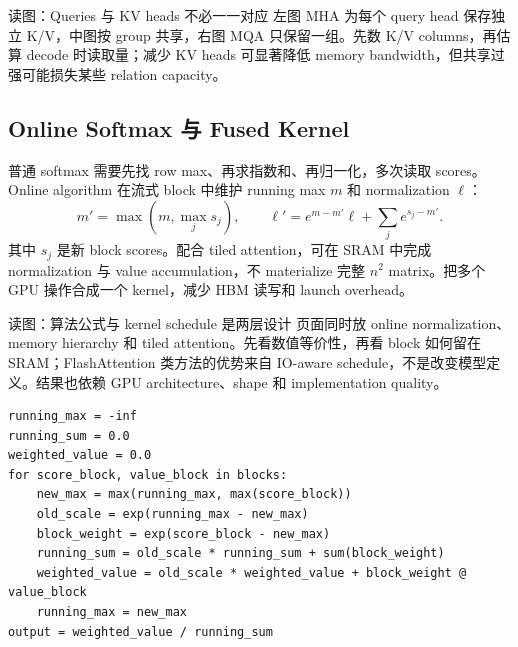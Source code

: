 
\begin{knowledgebox}{读图：Queries 与 KV heads 不必一一对应}
左图 MHA 为每个 query head 保存独立 K/V，中图按 group 共享，右图 MQA 只保留一组。先数 K/V columns，再估算 decode 时读取量；减少 KV heads 可显著降低 memory bandwidth，但共享过强可能损失某些 relation capacity。
\end{knowledgebox}

\subsection{Online Softmax 与 Fused Kernel}

普通 softmax 需要先找 row max、再求指数和、再归一化，多次读取 scores。Online algorithm 在流式 block 中维护 running max $m$ 和 normalization $\ell$：
\[
m' = \max(m,\max_j s_j),\qquad
\ell'=e^{m-m'}\ell+\sum_j e^{s_j-m'}.
\]
其中 $s_j$ 是新 block scores。配合 tiled attention，可在 SRAM 中完成 normalization 与 value accumulation，不 materialize 完整 $n^2$ matrix。把多个 GPU 操作合成一个 kernel，减少 HBM 读写和 launch overhead。


\begin{knowledgebox}{读图：算法公式与 kernel schedule 是两层设计}
页面同时放 online normalization、memory hierarchy 和 tiled attention。先看数值等价性，再看 block 如何留在 SRAM；FlashAttention 类方法的优势来自 IO-aware schedule，不是改变模型定义。结果也依赖 GPU architecture、shape 和 implementation quality。
\end{knowledgebox}

\begin{lstlisting}[caption={Online softmax 的流式归一化概念伪代码}]
running_max = -inf
running_sum = 0.0
weighted_value = 0.0
for score_block, value_block in blocks:
    new_max = max(running_max, max(score_block))
    old_scale = exp(running_max - new_max)
    block_weight = exp(score_block - new_max)
    running_sum = old_scale * running_sum + sum(block_weight)
    weighted_value = old_scale * weighted_value + block_weight @ value_block
    running_max = new_max
output = weighted_value / running_sum
\end{lstlisting}

